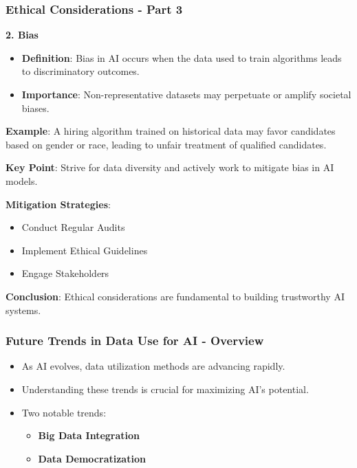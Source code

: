 \documentclass[aspectratio=169]{beamer}
\begin{document}
\begin{frame}[fragile]
    \frametitle{Ethical Considerations - Part 3}

    \textbf{2. Bias}

    \begin{itemize}
        \item \textbf{Definition}: Bias in AI occurs when the data used to train algorithms leads to discriminatory outcomes.
        \item \textbf{Importance}: Non-representative datasets may perpetuate or amplify societal biases.
    \end{itemize}

    \textbf{Example}:
    A hiring algorithm trained on historical data may favor candidates based on gender or race, leading to unfair treatment of qualified candidates.

    \textbf{Key Point}:
    Strive for data diversity and actively work to mitigate bias in AI models.

    \textbf{Mitigation Strategies}:
    \begin{itemize}
        \item Conduct Regular Audits
        \item Implement Ethical Guidelines
        \item Engage Stakeholders
    \end{itemize}

    \textbf{Conclusion}:
    Ethical considerations are fundamental to building trustworthy AI systems.
\end{frame}

\begin{frame}[fragile]
    \frametitle{Future Trends in Data Use for AI - Overview}
    \begin{itemize}
        \item As AI evolves, data utilization methods are advancing rapidly.
        \item Understanding these trends is crucial for maximizing AI's potential.
        \item Two notable trends:
        \begin{itemize}
            \item \textbf{Big Data Integration}
            \item \textbf{Data Democratization}
        \end{itemize}
    \end{itemize}
\end{frame}
\end{document}
